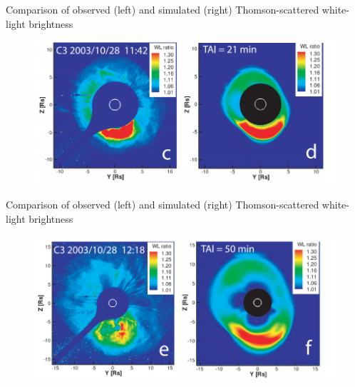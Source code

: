 \documentclass{beamer}
\begin{document}
\begin{frame}{Comparison of observed (left) and simulated (right) Thomson-scattered white-light brightness}
\begin{figure}[H]
 \centering
 \includegraphics[scale=0.4]{wltime2.png}
\end{figure}

\end{frame}


\begin{frame}{Comparison of observed (left) and simulated (right) Thomson-scattered white-light brightness}
\begin{figure}[H]
 \centering
 \includegraphics[scale=0.4]{wltime3.png}
\end{figure}

\end{frame}
\end{document}
